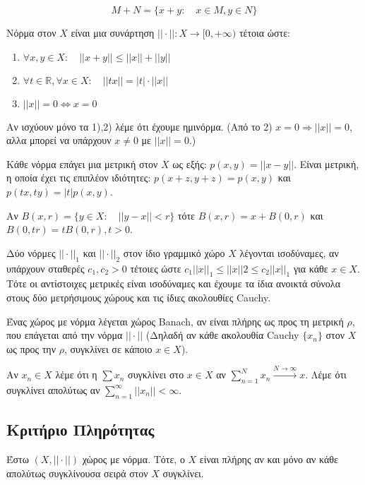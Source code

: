 $$M+N = \{x+y: \quad x\in M, y \in N\}$$


Νόρμα στον $X$ είναι μια συνάρτηση $||\cdot || : X \rightarrow [0,+\infty)$ τέτοια ώστε:

\begin{enumerate}
    \item $\forall x,y \in X: \quad ||x+y|| \leq ||x|| + ||y||$
    \item $\forall t \in\mathbb R, \forall x \in X: \quad ||tx|| = |t| \cdot ||x||$
    \item $||x|| = 0 \Leftrightarrow x=0$
\end{enumerate}


Αν ισχύουν μόνο τα 1),2) λέμε ότι έχουμε ημινόρμα. (Από το 2) $x=0 \Rightarrow ||x||=0$, αλλα μπορεί να υπάρχουν $x\neq 0$ με $||x|| = 0$.)


Κάθε νόρμα επάγει μια μετρική στον $X$ ως εξής: $p(x,y) = ||x-y||$. Είναι μετρική, η οποία έχει τις επιπλέον ιδιότητες: $p(x+z,y+z) = p(x,y)$ και $p(tx,ty) = |t| p(x,y)$.


Αν $B(x,r) = \{y \in X: \quad ||y-x|| < r\}$ τότε $B(x,r) = x + B(0,r)$ και $B(0,tr) = tB(0,r), t>0$.


Δύο νόρμες $||\cdot||_1$ και $||\cdot||_2$ στον ίδιο γραμμικό χώρο $X$ λέγονται ισοδύναμες, αν υπάρχουν σταθερές $c_1,c_2 >0$ τέτοιες ώστε $c_1 ||x||_1 \leq ||x||2 \leq c_2 ||x||_1$ για κάθε $x \in X$. Τότε οι αντίστοιχες μετρικές είναι ισοδύναμες και έχουμε τα ίδια ανοικτά σύνολα στους δύο μετρήσιμους χώρους και τις ίδιες ακολουθίες Cauchy.

\begin{definition}
    Ένας χώρος με νόρμα λέγεται χώρος Banach, αν είναι πλήρης ως προς τη μετρική $\rho$, που επάγεται από την νόρμα $||\cdot ||$ (Δηλαδή αν κάθε ακολουθία Cauchy $\{x_n\}$ στον $X$ ως προς την $\rho$, συγκλίνει σε κάποιο $x \in X$).
\end{definition}


Αν $x_n \in X$ λέμε ότι η $\sum x_n$ συγκλίνει στο $x \in X$ αν $\sum_{n=1}^N x_n \overset{ N\rightarrow \infty}{\longrightarrow } x$. Λέμε ότι συγκλίνει απολύτως αν $\sum_{n=1}^{\infty} ||x_n|| < \infty$.

\subsection{ Κριτήριο Πληρότητας}


Έστω $(X,||\cdot||)$ χώρος με νόρμα. Τότε, ο $X$ είναι πλήρης αν και μόνο αν κάθε απολύτως συγκλίνουσα σειρά στον $X$ συγκλίνει.

